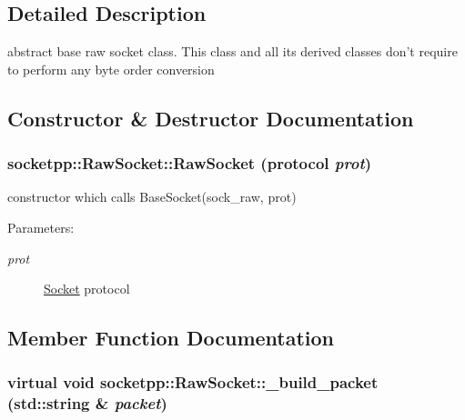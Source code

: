 \subsection{Detailed Description}
abstract base raw socket class. This class and all its derived classes don't require to perform any byte order conversion 

\subsection{Constructor \& Destructor Documentation}
\hypertarget{classsocketpp_1_1RawSocket_1a77e11388869bc70457efb75cd40b82}{
\subsubsection[{RawSocket}]{\setlength{\rightskip}{0pt plus 5cm}socketpp::RawSocket::RawSocket ({\bf protocol} {\em prot})}}
\label{classsocketpp_1_1RawSocket_1a77e11388869bc70457efb75cd40b82}


constructor which calls BaseSocket(sock\_\-raw, prot) 

\begin{Desc}
\item[Parameters:]
\begin{description}
\item[{\em prot}]\hyperlink{classsocketpp_1_1Socket}{Socket} protocol \end{description}
\end{Desc}


\subsection{Member Function Documentation}
\hypertarget{classsocketpp_1_1RawSocket_eb0a3f716c0fc46efa4123acf0fe1e66}{
\subsubsection[{\_\-build\_\-packet}]{\setlength{\rightskip}{0pt plus 5cm}virtual void socketpp::RawSocket::\_\-build\_\-packet (std::string \& {\em packet})}}
\label{classsocketpp_1_1RawSocket_eb0a3f716c0fc46efa4123acf0fe1e66}




